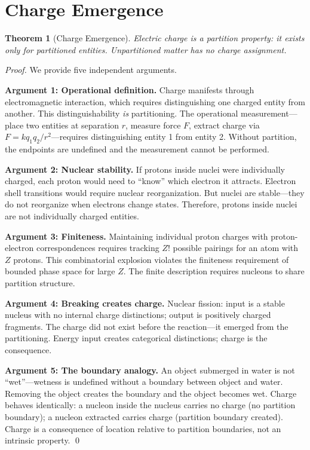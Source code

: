 \documentclass[twocolumn,10pt,a4paper]{article}
\newtheorem{theorem}{Theorem}[section]
\theoremstyle{definition}
\theoremstyle{remark}
\begin{document}
\section{Charge Emergence}
\label{sec:charge}

\begin{theorem}[Charge Emergence]
\label{thm:charge}
Electric charge is a partition property: it exists only for partitioned entities. Unpartitioned matter has no charge assignment.
\end{theorem}

\begin{proof}
We provide five independent arguments.

\textbf{Argument 1: Operational definition.}
Charge manifests through electromagnetic interaction, which requires distinguishing one charged entity from another. This distinguishability \emph{is} partitioning. The operational measurement---place two entities at separation $r$, measure force $F$, extract charge via $F = kq_1q_2/r^2$---requires distinguishing entity 1 from entity 2. Without partition, the endpoints are undefined and the measurement cannot be performed.

\textbf{Argument 2: Nuclear stability.}
If protons inside nuclei were individually charged, each proton would need to ``know'' which electron it attracts. Electron shell transitions would require nuclear reorganization. But nuclei are stable---they do not reorganize when electrons change states. Therefore, protons inside nuclei are not individually charged entities.

\textbf{Argument 3: Finiteness.}
Maintaining individual proton charges with proton-electron correspondences requires tracking $Z!$ possible pairings for an atom with $Z$ protons. This combinatorial explosion violates the finiteness requirement of bounded phase space for large $Z$. The finite description requires nucleons to share partition structure.

\textbf{Argument 4: Breaking creates charge.}
Nuclear fission: input is a stable nucleus with no internal charge distinctions; output is positively charged fragments. The charge did not exist before the reaction---it emerged from the partitioning. Energy input creates categorical distinctions; charge is the consequence.

\textbf{Argument 5: The boundary analogy.}
An object submerged in water is not ``wet''---wetness is undefined without a boundary between object and water. Removing the object creates the boundary and the object becomes wet. Charge behaves identically: a nucleon inside the nucleus carries no charge (no partition boundary); a nucleon extracted carries charge (partition boundary created). Charge is a consequence of location relative to partition boundaries, not an intrinsic property. \qed
\end{proof}
\end{document}
